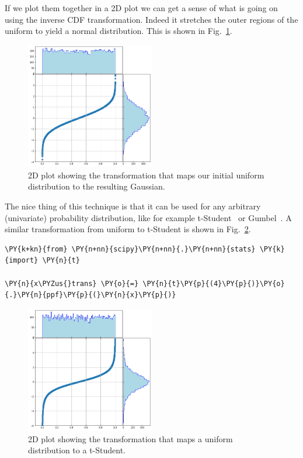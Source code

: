 If we plot them together in a 2D plot we can get a sense of what is
going on using the inverse CDF transformation.
Indeed it stretches the outer regions of the uniform to yield a
normal distribution. This is shown in Fig.~\ref{fig:uniform_to_gauss}. 
    
\begin{figure}[htbp]
  \centering
  \includegraphics[width=0.5\textwidth]{figures/lesson6_7_0.png}
  \caption{2D plot showing the transformation that maps our initial uniform distribution to the resulting Gaussian.}
  \label{fig:uniform_to_gauss}
\end{figure}
    
The nice thing of this technique is that it can be used
for any arbitrary (univariate) probability distribution, like for
example t-Student~\cite{bib:t_student} or Gumbel~\cite{bib:gumbel}.
A similar transformation from uniform to t-Student is shown in Fig.~\ref{fig:uniform_to_tstudent}.

\begin{codebox}
\begin{Verbatim}[commandchars=\\\{\}]
\PY{k+kn}{from} \PY{n+nn}{scipy}\PY{n+nn}{.}\PY{n+nn}{stats} \PY{k}{import} \PY{n}{t}

\PY{n}{x\PYZus{}trans} \PY{o}{=} \PY{n}{t}\PY{p}{(4}\PY{p}{)}\PY{o}{.}\PY{n}{ppf}\PY{p}{(}\PY{n}{x}\PY{p}{)}
\end{Verbatim}
\end{codebox}

\begin{figure}[htb]
  \centering
  \includegraphics[width=0.5\textwidth]{figures/tstudent_to_uniform}
  \caption{2D plot showing the transformation that maps a uniform distribution to a t-Student.}
  \label{fig:uniform_to_tstudent}
\end{figure}

